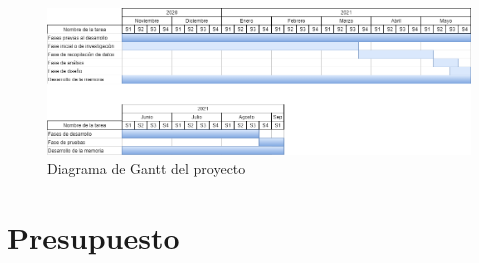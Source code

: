 \begin{figure}[h]
	\includegraphics[width=1.2\textwidth]{imagenes/gantt.png}
	\caption{Diagrama de Gantt del proyecto}
\end{figure}




\section{Presupuesto}



